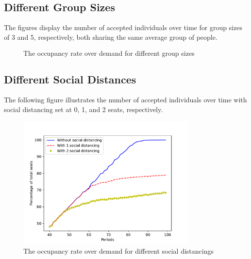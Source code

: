\subsection*{Different Group Sizes}
The figures display the number of accepted individuals over time for group sizes of 3 and 5, respectively, both sharing the same average group of people.

\begin{figure}[h]
  \centering
  \caption{The occupancy rate over demand for different group sizes}
\end{figure}

\subsection*{Different Social Distances}
The following figure illustrates the number of accepted individuals over time with social distancing set at 0, 1, and 2 seats, respectively.

\begin{figure}[ht]
  \centering
    \includegraphics[width=0.8\textwidth]{./Figures/distance.pdf}
  \caption{The occupancy rate over demand for different social distancings}
\end{figure}

